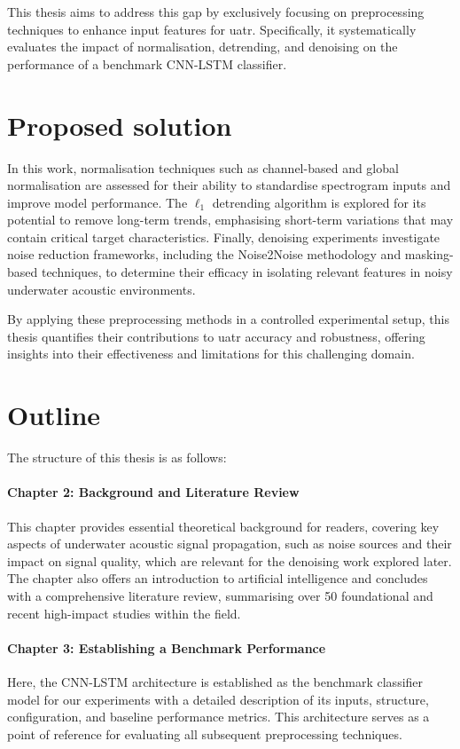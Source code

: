 This thesis aims to address this gap by exclusively focusing on preprocessing techniques to enhance input features for \acrshort{uatr}. Specifically, it systematically evaluates the impact of normalisation, detrending, and denoising on the performance of a benchmark CNN-LSTM classifier.

\section{Proposed solution}

In this work, normalisation techniques such as channel-based and global normalisation are assessed for their ability to standardise spectrogram inputs and improve model performance. The $\ell_1$ detrending algorithm is explored for its potential to remove long-term trends, emphasising short-term variations that may contain critical target characteristics. Finally, denoising experiments investigate noise reduction frameworks, including the Noise2Noise methodology and masking-based techniques, to determine their efficacy in isolating relevant features in noisy underwater acoustic environments.

By applying these preprocessing methods in a controlled experimental setup, this thesis quantifies their contributions to \acrshort{uatr} accuracy and robustness, offering insights into their effectiveness and limitations for this challenging domain.

\section{Outline}

The structure of this thesis is as follows:

\paragraph{Chapter 2: Background and Literature Review} This chapter provides essential theoretical background for readers, covering key aspects of underwater acoustic signal propagation, such as noise sources and their impact on signal quality, which are relevant for the denoising work explored later. The chapter also offers an introduction to artificial intelligence and concludes with a comprehensive literature review, summarising over 50 foundational and recent high-impact studies within the field.

\paragraph{Chapter 3: Establishing a Benchmark Performance} Here, the CNN-LSTM architecture is established as the benchmark classifier model for our experiments with a detailed description of its inputs, structure, configuration, and baseline performance metrics. This architecture serves as a point of reference for evaluating all subsequent preprocessing techniques.

